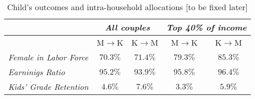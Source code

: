 \documentclass[12pt,letter]{article}
\begin{document}
\begin{table}
\centering
\begin{tabular}{|l||c|c||c|c|}\hline
& \multicolumn{2}{|c||}{\footnotesize \textit{All couples}}  & \multicolumn{2}{|c|}{\footnotesize \textit{Top 40\% of income} } \\\hline
&                       \footnotesize  M$\to$K & \footnotesize  K$\to$M &  \footnotesize  M$\to$K & \footnotesize  K$\to$M \\\hline
\footnotesize \textit{Female in Labor Force}        & $70.3\%$  & $71.4\%$  & $79.3\%$ & $85.3\%$  \\\hline
\footnotesize \textit{Earninigs Ratio}    &  $95.2\%$ & $93.9\%$  &  $95.8\%$ &  $96.4\%$ \\\hline
\footnotesize \textit{Kids' Grade Retention}  & $4.6\%$    & $7.6\%$ &   $3.3\%$   & $5.9\%$ \\\hline
\end{tabular}
\caption{Child's outcomes and intra-household allocations [to be fixed later]\label{intra}}
\end{table}

%
\end{document}
